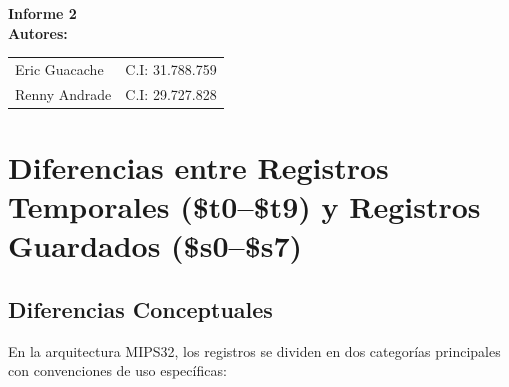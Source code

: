 \documentclass[12pt,a4paper]{article}
\begin{document}
	
	\begin{titlepage}
		\centering
		\vspace*{6cm}
		
		{\Huge \bfseries Informe 2} \\[3cm]
		
		{\Large \bfseries Autores:} \\[0.5cm]
		\begin{tabular}{ll}
			Eric Guacache & C.I: 31.788.759 \\
			Renny Andrade & C.I: 29.727.828
		\end{tabular}
		
		\vfill
	\end{titlepage}
	
	\newpage
	
	\tableofcontents
	\newpage
	
	
	\section{Diferencias entre Registros Temporales (\$t0--\$t9) y Registros Guardados (\$s0--\$s7)}
	
	\subsection{Diferencias Conceptuales}
	En la arquitectura MIPS32, los registros se dividen en dos categorías principales con convenciones de uso específicas:
	
\end{document}

